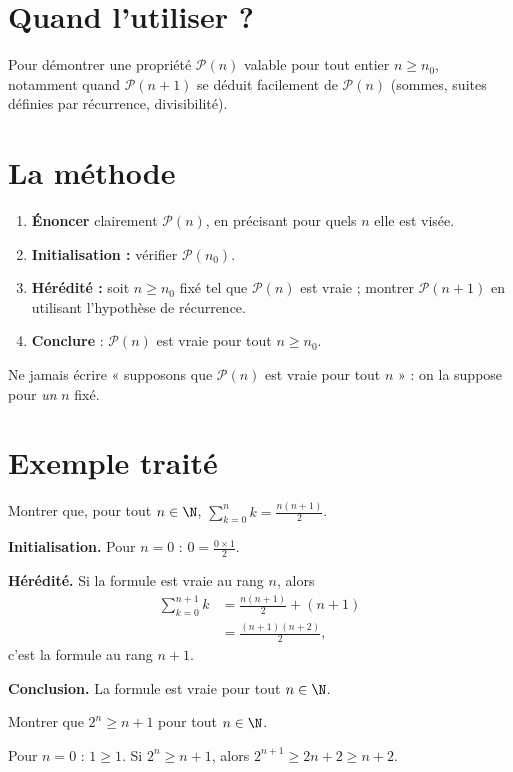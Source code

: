 
\section{Quand l'utiliser ?}

Pour démontrer une propriété $\mathcal{P}(n)$ valable pour tout entier $n\ge n_0$, notamment quand $\mathcal{P}(n+1)$ se déduit facilement de $\mathcal{P}(n)$ (sommes, suites définies par récurrence, divisibilité).

\section{La méthode}

\begin{methode}
\begin{enumerate}[label=\textbf{Étape \arabic*.}]
  \item \textbf{Énoncer} clairement $\mathcal{P}(n)$, en précisant pour quels $n$ elle est visée.
  \item \textbf{Initialisation :} vérifier $\mathcal{P}(n_0)$.
  \item \textbf{Hérédité :} soit $n\ge n_0$ fixé tel que $\mathcal{P}(n)$ est vraie ; montrer $\mathcal{P}(n+1)$ en utilisant l'hypothèse de récurrence.
  \item \textbf{Conclure} : $\mathcal{P}(n)$ est vraie pour tout $n\ge n_0$.
\end{enumerate}
\end{methode}

\begin{attention}
Ne jamais écrire « supposons que $\mathcal{P}(n)$ est vraie pour tout $n$ » : on la suppose pour \emph{un} $n$ fixé.
\end{attention}

\section{Exemple traité}

\begin{exemple}
Montrer que, pour tout $n\in\N$, $\displaystyle\sum_{k=0}^{n}k=\frac{n(n+1)}{2}$.

\textbf{Initialisation.} Pour $n=0$ : $0=\frac{0\times 1}{2}$.

\textbf{Hérédité.} Si la formule est vraie au rang $n$, alors
\begin{align*}
\sum_{k=0}^{n+1}k &= \frac{n(n+1)}{2}+(n+1)\\
&= \frac{(n+1)(n+2)}{2},
\end{align*}
c'est la formule au rang $n+1$.

\textbf{Conclusion.} La formule est vraie pour tout $n\in\N$.
\end{exemple}

\begin{exercice}[À vous]
Montrer que $2^n\ge n+1$ pour tout $n\in\N$.
\begin{correction}
Pour $n=0$ : $1\ge 1$. Si $2^n\ge n+1$, alors $2^{n+1}\ge 2n+2\ge n+2$.
\end{correction}
\end{exercice}
